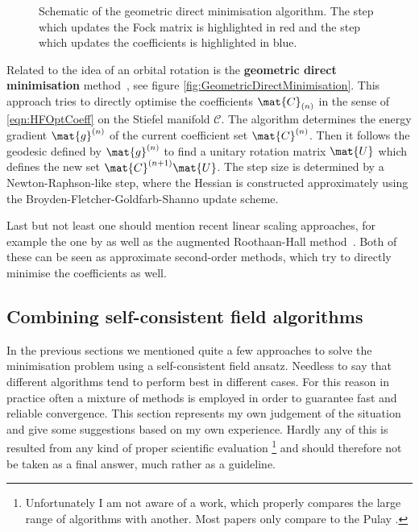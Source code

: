 \begin{figure}
	\centering
	\caption[Geometric direct minimisation algorithm]%
	{Schematic of the geometric direct minimisation algorithm.
	The step which updates the Fock matrix is highlighted in red
	and the step which updates the coefficients is highlighted in blue.
	}
	\label{fig:GeometricDirectMinimisation}
\end{figure}
Related to the idea of an orbital rotation \SCF
is the \textbf{geometric direct minimisation} method~\cite{Voorhis2002},
see figure \vref{fig:GeometricDirectMinimisation}.
This approach tries to directly
optimise the coefficients $\mat{C}_{(n)}$ in the sense of \eqref{eqn:HFOptCoeff}
on the Stiefel manifold $\mathcal{C}$.
The algorithm determines the energy gradient $\mat{g}^{(n)}$
of the current coefficient set $\mat{C}^{(n)}$.
Then it follows the geodesic defined by $\mat{g}^{(n)}$
to find a unitary rotation matrix $\mat{U}$
which defines the new set $\mat{C}^{(n+1)} \mat{U}$.
The step size is determined by a Newton-Raphson-like step,
where the Hessian is constructed
approximately using the Broyden-Fletcher-Goldfarb-Shanno update scheme.

Last but not least one should mention recent linear scaling \SCF approaches,
for example the one by \citet{Salek2007}
as well as the augmented Roothaan-Hall method~\cite{Hoest2008}.
Both of these can be seen as approximate second-order \SCF methods,
which try to directly minimise the coefficients as well.

\subsection{Combining self-consistent field algorithms}
In the previous sections we mentioned quite a few approaches
to solve the \HF minimisation problem using a self-consistent field ansatz.
Needless to say that different algorithms tend to perform best in different cases.
For this reason in practice often a mixture of methods
is employed in order to guarantee fast and reliable convergence.
This section represents my own judgement of the situation
and give some suggestions based on my own experience.
Hardly any of this is resulted from any kind of proper
scientific evaluation%
\footnote{Unfortunately I am not aware of a work,
which properly compares the large range of \SCF algorithms
with another.
Most papers only compare to the Pulay \DIIS.}
and should therefore not be taken as a final answer,
much rather as a guideline.

